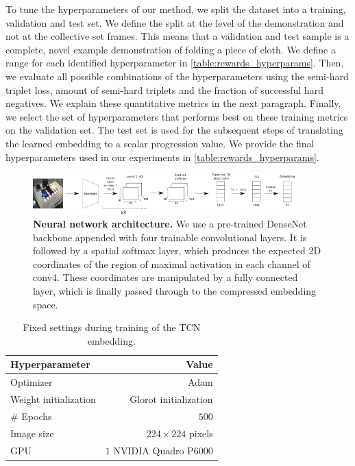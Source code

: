 \documentclass[\home/main.tex]{subfiles}
\begin{document}
To tune the hyperparameters of our method, we split the dataset into a training, validation and test set. We define the split at the level of the demonstration and not at the collective set frames. This means that a validation and test sample is a complete, novel example demonstration of folding a piece of cloth. We define a range for each identified hyperparameter in \cref{table:rewards_hyperparams}. Then, we evaluate all possible combinations of the hyperparameters using the semi-hard triplet loss, amount of semi-hard triplets and the fraction of successful hard negatives. We explain these quantitative metrics in the next paragraph. Finally, we select the set of hyperparameters that performs best on these training metrics on the validation set. The test set is used for the subsequent steps of translating the learned embedding to a scalar progression value. We provide the final hyperparameters used in our experiments in \cref{table:rewards_hyperparams}.

\begin{figure}[htb]
    \centering
    \includegraphics[width=0.90\textwidth, keepaspectratio]{figures/figs_ssr_nn_architecture.png}
    \caption{
        \textbf{Neural network architecture.} We use a pre-trained DenseNet backbone appended with four trainable convolutional layers. It is followed by a spatial softmax layer, which produces the expected 2D coordinates of the region of maximal activation in each channel of conv4. These coordinates are manipulated by a fully connected layer, which is finally passed through to the compressed embedding space.
    }
    \label{fig:rewards_nn_architecture}
\end{figure}

\begin{table}[htbp]
    \centering
    \caption{Fixed settings during training of the TCN embedding.}
    \begin{tabular}[t]{@{} l r @{}}

        \toprule
        Hyperparameter        & Value                   \\
        \midrule
        Optimizer             & Adam                    \\
        Weight initialization & Glorot initialization   \\
        \# Epochs             & $500$                   \\
        Image size            & $224 \times 224$ pixels \\
        GPU                   & $1$ NVIDIA Quadro P6000 \\
        \bottomrule
    \end{tabular}
    \label{table:rewards_settings}
\end{table}
\end{document}
